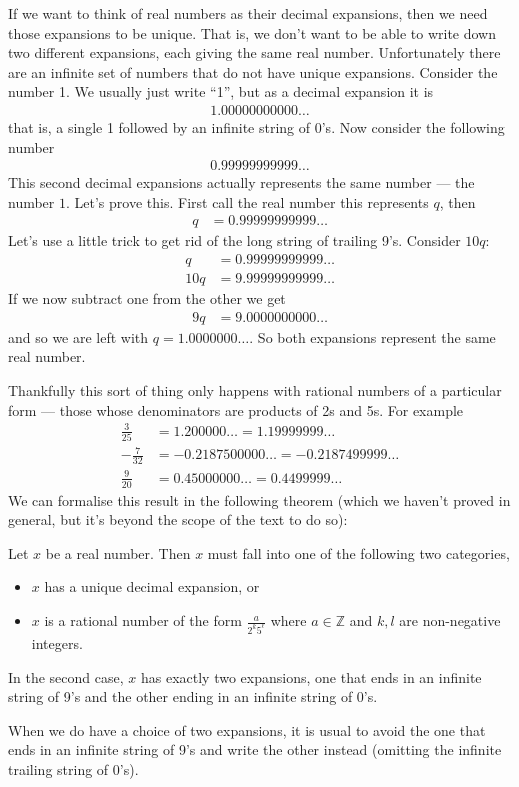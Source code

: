 If we want to think of real numbers as their decimal expansions, then we need
those expansions to be unique. That is, we don't want to be able to write down
two different expansions, each giving the same real number. Unfortunately there
are an infinite set of numbers that do not have unique expansions. Consider the
number 1. We usually just write ``1'', but as a decimal expansion it is
\begin{align*}
  1.00000000000\dots
\end{align*}
that is, a single 1 followed by an infinite string of 0's. Now consider the
following number
\begin{align*}
  0.99999999999\dots
\end{align*}
This second decimal expansions actually represents the same number ---
the number $1$. Let's prove this. First call the real number this
represents $q$, then
\begin{align*}
  q &=0.99999999999\dots
\end{align*}
Let's use a little trick to get rid of the long string of trailing 9's. Consider
$10q$:
\begin{align*}
  q &=0.99999999999\dots\\
  10q &=9.99999999999\dots
\end{align*}
If we now subtract one from the other we get
\begin{align*}
  9q &= 9.0000000000\dots
\end{align*}
and so we are left with $q=1.0000000\dots$. So both expansions represent the
same real number.

Thankfully this sort of thing only happens with rational numbers of a
particular form --- those whose denominators are products of 2s and 5s. For
example
\begin{align*}
  \frac{3}{25} &= 1.200000\dots = 1.19999999\dots\\
  -\frac{7}{32} &= -0.2187500000\dots = -0.2187499999\dots\\
  \frac{9}{20} &= 0.45000000\dots = 0.4499999\dots
\end{align*}
We can formalise this result in the following theorem (which we haven't proved
in general, but it's beyond the scope of the text to do so):
\begin{theorem}
 Let $x$ be a real number. Then $x$ must fall into one of the following two
categories,
\begin{itemize}
 \item $x$ has a unique decimal expansion, or
 \item $x$ is a rational number of the form $\frac{a}{2^k 5^\ell}$ where $a\in
\mathbb{Z}$ and $k,l$ are non-negative integers.
\end{itemize}
In the second case, $x$ has exactly two expansions, one that ends in an
infinite string of 9's and the other ending in an infinite string of 0's.
\end{theorem}
When we do have a choice of two expansions, it is usual to avoid the one that
ends in an infinite string of 9's and write the other instead (omitting the
infinite trailing string of 0's).

